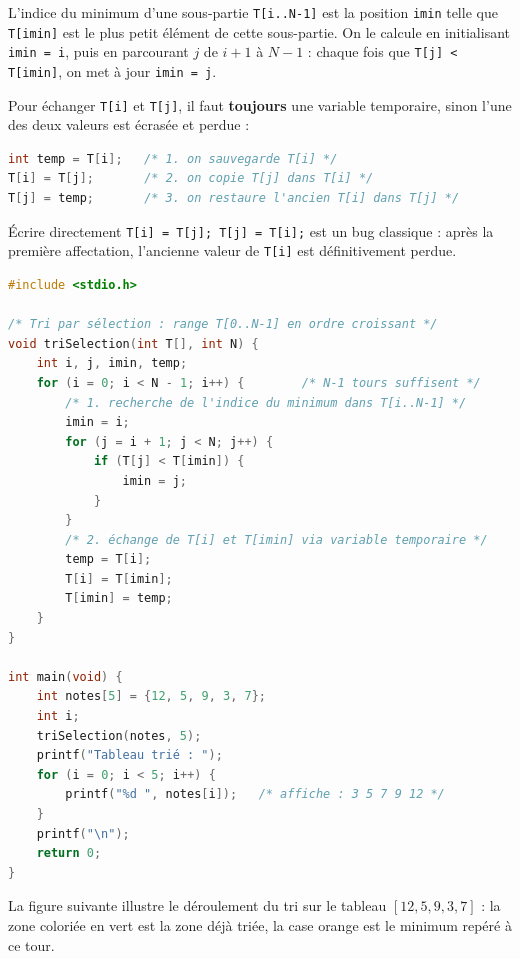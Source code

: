 \documentclass[11pt]{article}
\newcommand{\cle}[1]{{\popxbold\color{popdark}#1}}
\begin{document}
\begin{definition}
L'\cle{indice du minimum} d'une sous-partie \texttt{T[i..N-1]} est la position \texttt{imin} telle que \texttt{T[imin]} est le plus petit élément de cette sous-partie. On le calcule en initialisant \texttt{imin = i}, puis en parcourant $j$ de $i+1$ à $N-1$ : chaque fois que \texttt{T[j] < T[imin]}, on met à jour \texttt{imin = j}.
\end{definition}

\begin{methode}
Pour échanger \texttt{T[i]} et \texttt{T[j]}, il faut \textbf{toujours} une variable temporaire, sinon l'une des deux valeurs est écrasée et perdue :
\begin{lstlisting}[language=C]
int temp = T[i];   /* 1. on sauvegarde T[i] */
T[i] = T[j];       /* 2. on copie T[j] dans T[i] */
T[j] = temp;       /* 3. on restaure l'ancien T[i] dans T[j] */
\end{lstlisting}
Écrire directement \texttt{T[i] = T[j]; T[j] = T[i];} est un bug classique : après la première affectation, l'ancienne valeur de \texttt{T[i]} est définitivement perdue.
\end{methode}

\begin{exemplebox}
\begin{lstlisting}[language=C]
#include <stdio.h>

/* Tri par sélection : range T[0..N-1] en ordre croissant */
void triSelection(int T[], int N) {
    int i, j, imin, temp;
    for (i = 0; i < N - 1; i++) {        /* N-1 tours suffisent */
        /* 1. recherche de l'indice du minimum dans T[i..N-1] */
        imin = i;
        for (j = i + 1; j < N; j++) {
            if (T[j] < T[imin]) {
                imin = j;
            }
        }
        /* 2. échange de T[i] et T[imin] via variable temporaire */
        temp = T[i];
        T[i] = T[imin];
        T[imin] = temp;
    }
}

int main(void) {
    int notes[5] = {12, 5, 9, 3, 7};
    int i;
    triSelection(notes, 5);
    printf("Tableau trié : ");
    for (i = 0; i < 5; i++) {
        printf("%d ", notes[i]);   /* affiche : 3 5 7 9 12 */
    }
    printf("\n");
    return 0;
}
\end{lstlisting}
\end{exemplebox}

La figure suivante illustre le déroulement du tri sur le tableau $[12, 5, 9, 3, 7]$ : la zone coloriée en vert est la zone déjà triée, la case orange est le minimum repéré à ce tour.
\end{document}
